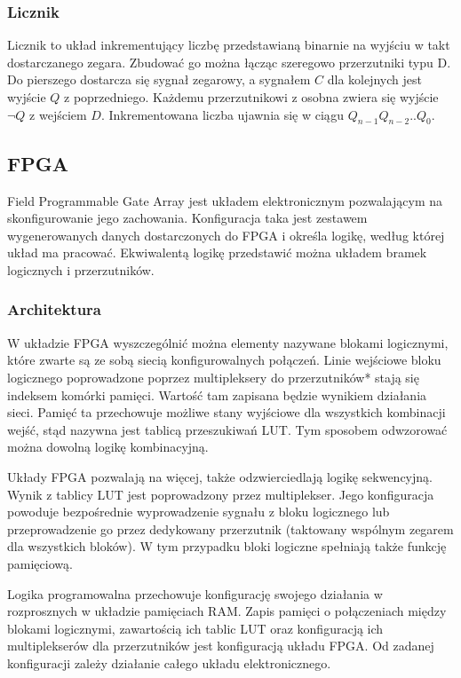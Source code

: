 \documentclass[a4paper,12pt]{article}
\begin{document}
\subsubsection{Licznik}

Licznik to układ inkrementujący liczbę przedstawianą binarnie na wyjściu w takt dostarczanego zegara. Zbudować go można łącząc szeregowo przerzutniki typu D. Do pierszego dostarcza się sygnał zegarowy, a sygnałem $C$ dla kolejnych jest wyjście $Q$ z poprzedniego. Każdemu przerzutnikowi z osobna zwiera się wyjście $\lnot Q$ z wejściem $D$. Inkrementowana liczba ujawnia się w ciągu $Q_{n-1} Q_{n-2} .. Q_{0}$.

\subsection{FPGA}

Field Programmable Gate Array jest układem elektronicznym pozwalającym na skonfigurowanie jego zachowania. Konfiguracja taka jest zestawem wygenerowanych danych dostarczonych do FPGA i określa logikę, według której układ ma pracować. Ekwiwalentą logikę przedstawić można układem bramek logicznych i przerzutników.

\subsubsection{Architektura}

W układzie FPGA wyszczególnić można elementy nazywane blokami logicznymi, które zwarte są ze sobą siecią konfigurowalnych połączeń. Linie wejściowe bloku logicznego poprowadzone poprzez multipleksery do przerzutników* stają się indeksem komórki pamięci. Wartość tam zapisana będzie wynikiem działania sieci. Pamięć ta przechowuje możliwe stany wyjściowe dla wszystkich kombinacji wejść, stąd nazywna jest tablicą przeszukiwań LUT. Tym sposobem odwzorować można dowolną logikę kombinacyjną.

Układy FPGA pozwalają na więcej, także odzwierciedlają logikę sekwencyjną. Wynik z tablicy LUT jest poprowadzony przez multiplekser. Jego konfiguracja powoduje bezpośrednie wyprowadzenie sygnału z bloku logicznego lub przeprowadzenie go przez dedykowany przerzutnik (taktowany wspólnym zegarem dla wszystkich bloków). W tym przypadku bloki logiczne spełniają także funkcję pamięciową.

Logika programowalna przechowuje konfigurację swojego działania w rozprosznych w układzie pamięciach RAM. Zapis pamięci o połączeniach między blokami logicznymi, zawartością ich tablic LUT oraz konfiguracją ich multiplekserów dla przerzutników jest konfiguracją układu FPGA. Od zadanej konfiguracji zależy działanie całego układu elektronicznego.
\end{document}
